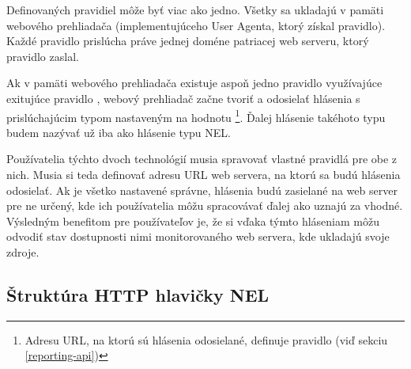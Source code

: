Definovaných pravidiel môže byť viac ako jedno.
Všetky sa ukladajú v pamäti webového prehliadača (implementujúceho User Agenta, ktorý získal pravidlo).
Každé pravidlo prislúcha práve jednej doméne patriacej web serveru, ktorý pravidlo zaslal. 

Ak v pamäti webového prehliadača existuje aspoň jedno pravidlo  využívajúce exitujúce pravidlo , 
webový prehliadač začne tvoriť a odosielať hlásenia s prislúchajúcim typom nastaveným na hodnotu \footnote{Adresu URL, na ktorú sú hlásenia odosielané, definuje pravidlo  (viď sekciu \ref{reporting-api})}. 
Ďalej hlásenie takéhoto typu budem nazývať už iba ako hlásenie typu NEL.

Používatelia týchto dvoch technológií musia spravovať vlastné pravidlá pre obe z nich.
Musia si teda definovať adresu URL web servera, na ktorú sa budú hlásenia odosielať.
Ak je všetko nastavené správne, hlásenia budú zasielané na web server pre ne určený, kde ich používatelia môžu spracovávať ďalej ako uznajú za vhodné.
Výsledným benefitom pre používateľov je, že si vďaka týmto hláseniam môžu odvodiť stav dostupnosti nimi monitorovaného web servera, kde ukladajú svoje zdroje.

\subsection{Štruktúra HTTP hlavičky NEL}
\label{struktura-http-hlavicky-nel}

